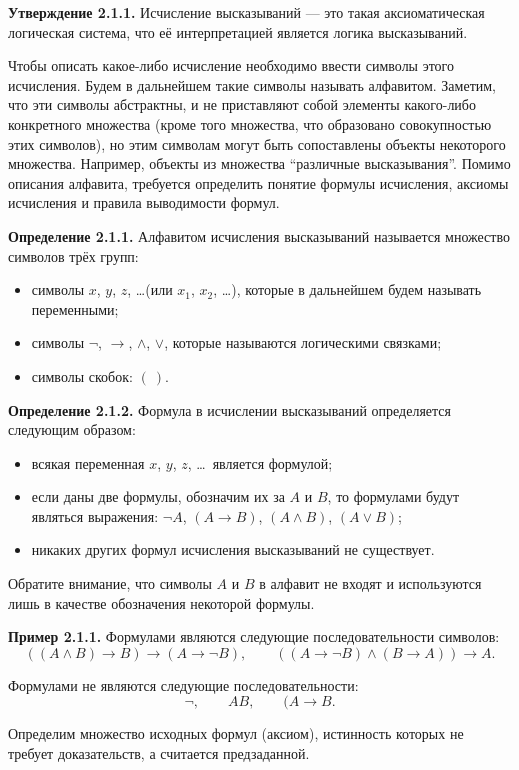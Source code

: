 \documentclass[12pt,letterpaper]{article}
\begin{document}
\textbf{Утверждение 2.1.1.} Исчисление высказываний --- это такая аксиоматическая логическая система, что её интерпретацией является логика высказываний.

Чтобы описать какое-либо исчисление необходимо ввести символы этого исчисления. Будем в дальнейшем такие символы называть алфавитом. Заметим, что эти символы абстрактны, и не приставляют собой элементы какого-либо конкретного множества (кроме того множества, что образовано совокупностью этих символов), но этим символам могут быть сопоставлены объекты некоторого множества. Например, объекты из множества ``различные высказывания''. Помимо описания алфавита, требуется определить понятие формулы исчисления, аксиомы исчисления и правила выводимости формул.

\textbf{Определение 2.1.1.} Алфавитом исчисления высказываний называется множество символов трёх групп:
\begin{itemize}
    \item символы $x$, $y$, $z$, \dots (или $x_1$, $x_2$, \dots), которые в дальнейшем будем называть переменными;
    \item символы $\neg$, $\to$, $\land$, $\lor$, которые называются логическими связками;
    \item символы скобок: $(\ )$.
\end{itemize}

\textbf{Определение 2.1.2.} Формула в исчислении высказываний определяется следующим образом:
\begin{itemize}
    \item всякая переменная $x$, $y$, $z$, \dots\ является формулой;
    \item если даны две формулы, обозначим их за $A$ и $B$, то формулами будут являться выражения: $\neg A$, $(A \to B)$, $(A \land B)$, $(A \lor B)$;
    \item никаких других формул исчисления высказываний не существует.
\end{itemize}

Обратите внимание, что символы $A$ и $B$ в алфавит не входят и используются лишь в качестве обозначения некоторой формулы.

\textbf{Пример 2.1.1.} Формулами являются следующие последовательности символов:
\[
((A \land B)\to B)\to(A\to \neg B), \qquad ((A\to \neg B)\land(B\to A))\to A.
\]

Формулами не являются следующие последовательности:
\[
\neg,\qquad AB,\qquad (A\to B.
\]

Определим множество исходных формул (аксиом), истинность которых не требует доказательств, а считается предзаданной.
\end{document}
